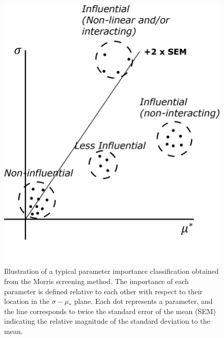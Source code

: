 \begin{figure}[bth]
	\centering
	\includegraphics[scale=0.90]{../figures/illustrateMorrisResult/illustrateMorrisResult.png}
	\caption[Illustration of a typical parameter importance classification based on Morris screening method]{Illustration of a typical parameter importance classification obtained from the Morris screening method. The importance of each parameter is defined relative to each other with respect to their location in the $\sigma - \mu_*$ plane. Each dot represents a parameter, and the line corresponds to twice the standard error of the mean (SEM) indicating the relative magnitude of the standard deviation to the mean.}\label{fig:illustration_morris_result}
\end{figure}
